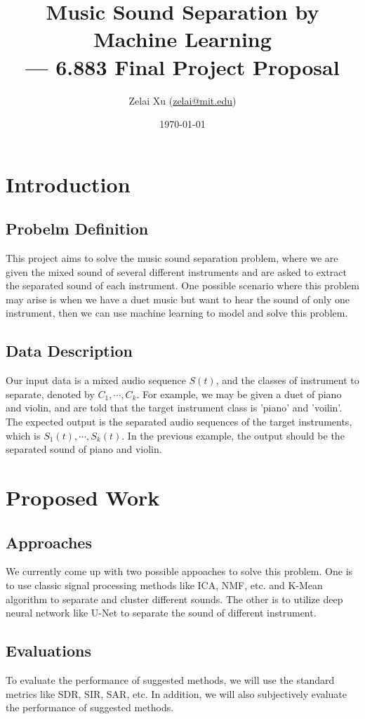 \documentclass{article}
\title{\textbf{Music Sound Separation by Machine Learning}\\ --- 6.883 Final Project Proposal}
\author{Zelai Xu (\href{mailto:zelai@mit.edu}{zelai@mit.edu})}
\date{\today}
\begin{document}
\maketitle

\section{Introduction}

\subsection{Probelm Definition}
This project aims to solve the music sound separation problem, where we are given the mixed sound of several different instruments and are asked to extract the separated sound of each instrument. One possible scenario where this problem may arise is when we have a duet music but want to hear the sound of only one instrument, then we can use machine learning to model and solve this problem.

\subsection{Data Description}
Our input data is a mixed audio sequence $S(t)$, and the classes of instrument to separate, denoted by $C_1,\cdots,C_k$. For example, we may be given a duet of piano and violin, and are told that the target instrument class is 'piano' and 'voilin'. The expected output is the separated audio sequences of the target instruments, which is $S_1(t),\cdots,S_k(t)$. In the previous example, the output should be the separated sound of piano and violin.

\section{Proposed Work}

\subsection{Approaches}
We currently come up with two possible appoaches to solve this problem. One is to use classic signal processing methods like ICA, NMF, etc. and K-Mean algorithm to separate and cluster different sounds. The other is to utilize deep neural network like U-Net to separate the sound of different instrument.

\subsection{Evaluations}
To evaluate the performance of suggested methods, we will use the standard metrics like SDR, SIR, SAR, etc. In addition, we will also subjectively evaluate the performance of suggested methods.
\end{document}
